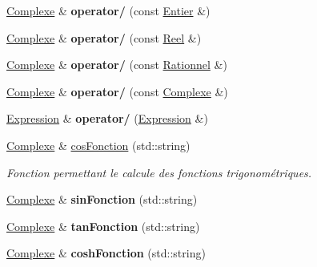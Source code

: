 \begin{DoxyCompactItemize}
\item 
\hypertarget{class_complexe_a32ed305645e63f7b2151c8dc7c7df76f}{\hyperlink{class_complexe}{Complexe} \& {\bfseries operator/} (const \hyperlink{class_entier}{Entier} \&)}\label{class_complexe_a32ed305645e63f7b2151c8dc7c7df76f}

\item 
\hypertarget{class_complexe_aed3d758e4a4e56660511d0fb41a82786}{\hyperlink{class_complexe}{Complexe} \& {\bfseries operator/} (const \hyperlink{class_reel}{Reel} \&)}\label{class_complexe_aed3d758e4a4e56660511d0fb41a82786}

\item 
\hypertarget{class_complexe_a52013dde54f2fd70750421ebf862aef4}{\hyperlink{class_complexe}{Complexe} \& {\bfseries operator/} (const \hyperlink{class_rationnel}{Rationnel} \&)}\label{class_complexe_a52013dde54f2fd70750421ebf862aef4}

\item 
\hypertarget{class_complexe_a23e5c1600cb8c0a63fbd6e8b67bd9dc1}{\hyperlink{class_complexe}{Complexe} \& {\bfseries operator/} (const \hyperlink{class_complexe}{Complexe} \&)}\label{class_complexe_a23e5c1600cb8c0a63fbd6e8b67bd9dc1}

\item 
\hypertarget{class_complexe_ab09b368175de16af6caa91b1f898882d}{\hyperlink{class_expression}{Expression} \& {\bfseries operator/} (\hyperlink{class_expression}{Expression} \&)}\label{class_complexe_ab09b368175de16af6caa91b1f898882d}

\item 
\hyperlink{class_complexe}{Complexe} \& \hyperlink{class_complexe_afda6d543bb4195b86b367213659ffb91}{cos\-Fonction} (std\-::string)
\begin{DoxyCompactList}\small\item\em Fonction permettant le calcule des fonctions trigonométriques. \end{DoxyCompactList}\item 
\hypertarget{class_complexe_a99fa7640f8e49a8cff859f74480b9ce6}{\hyperlink{class_complexe}{Complexe} \& {\bfseries sin\-Fonction} (std\-::string)}\label{class_complexe_a99fa7640f8e49a8cff859f74480b9ce6}

\item 
\hypertarget{class_complexe_aaaefd1999856bb13c6df425cc7c6f34c}{\hyperlink{class_complexe}{Complexe} \& {\bfseries tan\-Fonction} (std\-::string)}\label{class_complexe_aaaefd1999856bb13c6df425cc7c6f34c}

\item 
\hypertarget{class_complexe_a1bdd47084fa06f2275d553d85d76c1e0}{\hyperlink{class_complexe}{Complexe} \& {\bfseries cosh\-Fonction} (std\-::string)}\label{class_complexe_a1bdd47084fa06f2275d553d85d76c1e0}


\end{DoxyCompactItemize}
